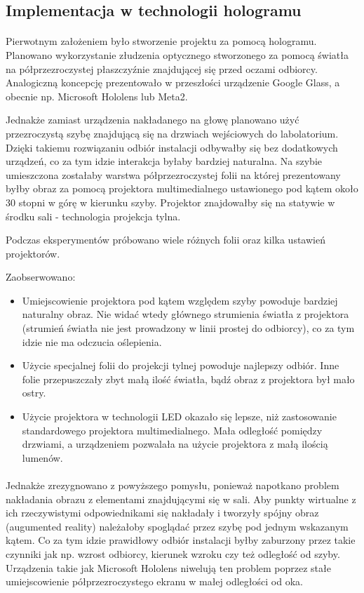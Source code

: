 \subsection{Implementacja w technologii hologramu}
\paragraph{}
Pierwotnym założeniem było stworzenie projektu za pomocą hologramu. Planowano wykorzystanie złudzenia optycznego stworzonego za pomocą światła na półprzezroczystej płaszczyźnie znajdującej się przed oczami odbiorcy. Analogiczną koncepcję prezentowało w przeszłości urządzenie Google Glass, a obecnie np. Microsoft Hololens lub Meta2.

Jednakże zamiast urządzenia nakładanego na głowę planowano użyć przezroczystą szybę znajdującą się na drzwiach wejściowych do labolatorium. Dzięki takiemu rozwiązaniu odbiór instalacji odbywałby się bez dodatkowych urządzeń, co za tym idzie interakcja byłaby bardziej naturalna.
Na szybie umieszczona zostałaby warstwa półprzezroczystej folii na której prezentowany byłby obraz za pomocą projektora multimedialnego ustawionego pod kątem około 30 stopni w górę w kierunku szyby. Projektor znajdowałby się na statywie w środku sali - technologia projekcja tylna.

Podczas eksperymentów próbowano wiele różnych folii oraz kilka ustawień projektorów. 

Zaobserwowano:
\begin{itemize}
	\item Umiejscowienie projektora pod kątem względem szyby powoduje bardziej naturalny obraz. Nie widać wtedy głównego strumienia światła z projektora (strumień światła nie jest prowadzony w linii prostej do odbiorcy), co za tym idzie  nie ma odczucia oślepienia.
    \item Użycie specjalnej folii do projekcji tylnej powoduje najlepszy odbiór. Inne folie przepuszczały zbyt małą ilość światła, bądź obraz z projektora był mało ostry.
    \item Użycie projektora w technologii LED okazało się lepsze, niż zastosowanie standardowego projektora multimedialnego. Mała odległość pomiędzy drzwiami, a urządzeniem pozwalała na użycie projektora z małą ilością lumenów.
\end{itemize}

\paragraph{}
Jednakże zrezygnowano z powyższego pomysłu, ponieważ napotkano problem nakładania obrazu z  elementami znajdującymi się w sali. Aby punkty wirtualne z ich rzeczywistymi odpowiednikami się nakładały i tworzyły spójny obraz (augumented reality) należałoby spoglądać przez szybę pod jednym wskazanym kątem. Co za tym idzie prawidłowy odbiór instalacji byłby zaburzony przez takie czynniki jak np. wzrost odbiorcy, kierunek wzroku czy też odległość od szyby. Urządzenia takie jak Microsoft Hololens niwelują ten problem poprzez stałe umiejscowienie półprzezroczystego ekranu w małej odległości od oka. 

